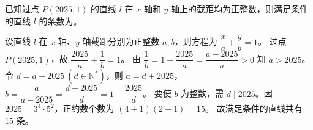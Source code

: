 \begin{question}
已知过点 $P(2025,1)$ 的直线 $l$ 在 $x$ 轴和 $y$ 轴上的截距均为正整数，则满足条件的直线 $l$ 的条数为\fillin[$15$]。
\begin{solution}
设直线 $l$ 在 $x$ 轴、$y$ 轴截距分别为正整数 $a,b$，则方程为 $\dfrac{x}{a}+\dfrac{y}{b}=1$。
过点 $P(2025,1)$，故 $\dfrac{2025}{a}+\dfrac{1}{b}=1$。
由 $\dfrac{1}{b}=1-\dfrac{2025}{a}=\dfrac{a-2025}{a}>0$ 知 $a>2025$。令 $d=a-2025\ (d\in\mathbb{N}^*)$，则 $a=d+2025$，
$b=\dfrac{a}{a-2025}=\dfrac{d+2025}{d}=1+\dfrac{2025}{d}$。
要使 $b$ 为整数，需 $d\mid 2025$。因 $2025=3^4\cdot 5^2$，正约数个数为 $(4+1)(2+1)=15$。
故满足条件的直线共有 $15$ 条。
\end{solution}
\end{question}

